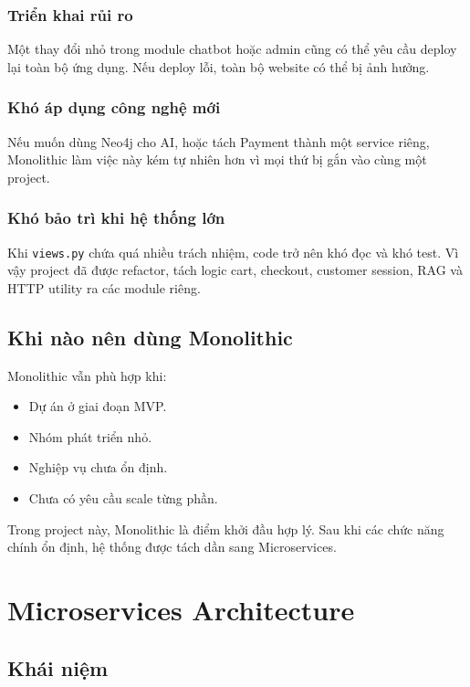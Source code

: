 \documentclass[12pt,a4paper]{report}
\begin{document}
\subsubsection{Triển khai rủi ro}

Một thay đổi nhỏ trong module chatbot hoặc admin cũng có thể yêu cầu deploy lại toàn bộ ứng dụng. Nếu deploy lỗi, toàn bộ website có thể bị ảnh hưởng.

\subsubsection{Khó áp dụng công nghệ mới}

Nếu muốn dùng Neo4j cho AI, hoặc tách Payment thành một service riêng, Monolithic làm việc này kém tự nhiên hơn vì mọi thứ bị gắn vào cùng một project.

\subsubsection{Khó bảo trì khi hệ thống lớn}

Khi \texttt{views.py} chứa quá nhiều trách nhiệm, code trở nên khó đọc và khó test. Vì vậy project đã được refactor, tách logic cart, checkout, customer session, RAG và HTTP utility ra các module riêng.

\subsection{Khi nào nên dùng Monolithic}

Monolithic vẫn phù hợp khi:

\begin{itemize}
  \item Dự án ở giai đoạn MVP.
  \item Nhóm phát triển nhỏ.
  \item Nghiệp vụ chưa ổn định.
  \item Chưa có yêu cầu scale từng phần.
\end{itemize}

Trong project này, Monolithic là điểm khởi đầu hợp lý. Sau khi các chức năng chính ổn định, hệ thống được tách dần sang Microservices.

\section{Microservices Architecture}

\subsection{Khái niệm}
\end{document}
